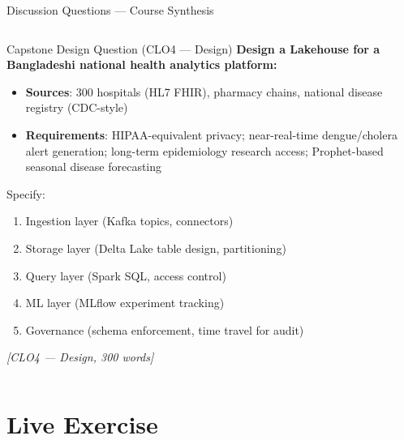 \documentclass[aspectratio=169,10pt]{beamer}
\begin{document}
\begin{frame}{Discussion Questions — Course Synthesis}
\begin{columns}[T]
      \begin{alertblock}{Capstone Design Question \textmd{\tiny (CLO4 — Design)}}
        \textbf{Design a Lakehouse for a Bangladeshi national health
        analytics platform:}
        \begin{itemize}
          \item \textbf{Sources}: 300 hospitals (HL7 FHIR), pharmacy
                chains, national disease registry (CDC-style)
          \item \textbf{Requirements}: HIPAA-equivalent privacy;
                near-real-time dengue/cholera alert generation;
                long-term epidemiology research access; Prophet-based
                seasonal disease forecasting
        \end{itemize}
        \vspace{4pt}
        Specify:
        \begin{enumerate}
          \item Ingestion layer (Kafka topics, connectors)
          \item Storage layer (Delta Lake table design, partitioning)
          \item Query layer (Spark SQL, access control)
          \item ML layer (MLflow experiment tracking)
          \item Governance (schema enforcement, time travel for audit)
        \end{enumerate}
        \textit{[CLO4 — Design, 300 words]}
      \end{alertblock}
  \end{columns}
\end{frame}

\section{Live Exercise}
\end{document}
